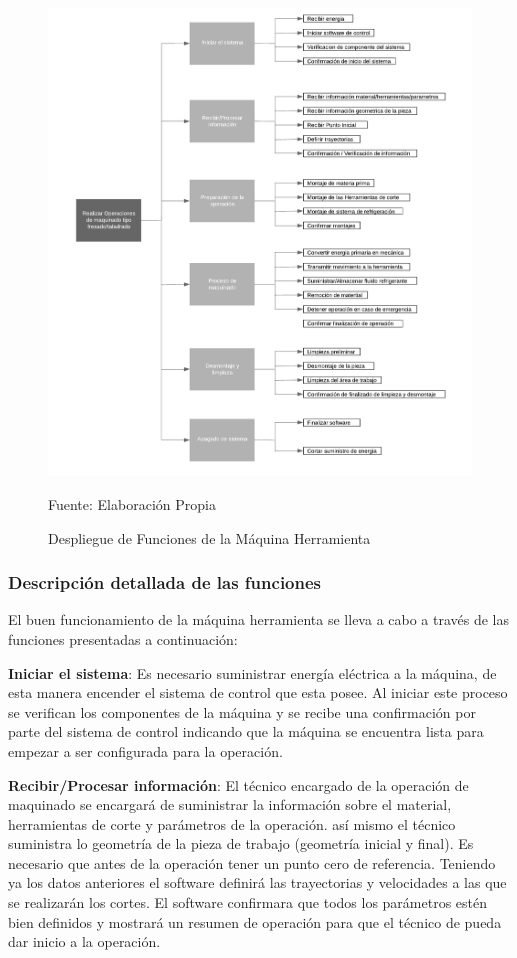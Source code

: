 \begin{figure}[ht!]
    \centering
    \includegraphics[width = \textwidth]{Cap3_DisenoConceptual/Figura/DespliegueFuncional.pdf}
    \caption{Despliegue de Funciones de la Máquina Herramienta}{Fuente: Elaboración Propia}
    \label{fig:DespliegueFuncional}
\end{figure}

\subsubsection{Descripción detallada de las funciones}
El buen funcionamiento de la máquina herramienta se lleva a cabo a través de las funciones presentadas a continuación:

\textbf{Iniciar el sistema}: Es necesario suministrar energía eléctrica a la máquina, de esta manera encender el sistema de control que esta posee. Al iniciar este proceso se verifican los componentes de la máquina y se recibe una confirmación por parte del sistema de control indicando que la máquina se encuentra lista para empezar a ser configurada para la operación. 

\textbf{Recibir/Procesar información}: El técnico encargado de la operación de maquinado se encargará de suministrar la información sobre el material, herramientas de corte y parámetros de la operación. así mismo el técnico suministra lo geometría de la pieza de trabajo (geometría inicial y final). Es necesario que antes de la operación tener un punto cero de referencia. Teniendo ya los datos anteriores el software definirá las trayectorias y velocidades a las que se realizarán los cortes. El software confirmara que todos los parámetros estén bien definidos y mostrará un resumen de operación para que el técnico de pueda dar inicio a la operación.

